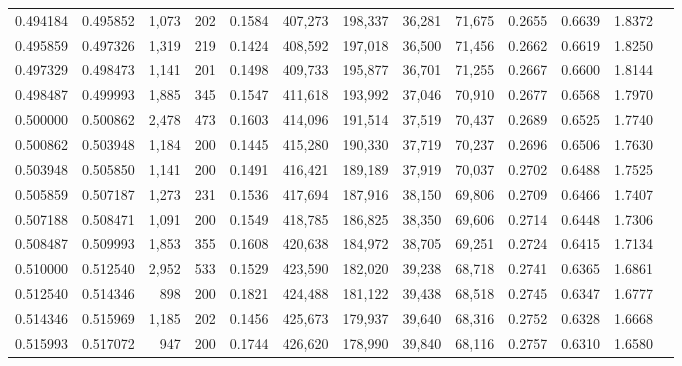 \begin{tabular}{rrrrrrrrrrrrr}
0.494184 & 0.495852 & 1,073 & 202 &                                     0.1584 & 407,273 & 198,337 &  36,281 &  71,675 & 0.2655 & 0.6639 & 1.8372 \\
0.495859 & 0.497326 & 1,319 & 219 &                                     0.1424 & 408,592 & 197,018 &  36,500 &  71,456 & 0.2662 & 0.6619 & 1.8250 \\
0.497329 & 0.498473 & 1,141 & 201 &                                     0.1498 & 409,733 & 195,877 &  36,701 &  71,255 & 0.2667 & 0.6600 & 1.8144 \\
0.498487 & 0.499993 & 1,885 & 345 &                                     0.1547 & 411,618 & 193,992 &  37,046 &  70,910 & 0.2677 & 0.6568 & 1.7970 \\
0.500000 & 0.500862 & 2,478 & 473 &                                     0.1603 & 414,096 & 191,514 &  37,519 &  70,437 & 0.2689 & 0.6525 & 1.7740 \\
0.500862 & 0.503948 & 1,184 & 200 &                                     0.1445 & 415,280 & 190,330 &  37,719 &  70,237 & 0.2696 & 0.6506 & 1.7630 \\
0.503948 & 0.505850 & 1,141 & 200 &                                     0.1491 & 416,421 & 189,189 &  37,919 &  70,037 & 0.2702 & 0.6488 & 1.7525 \\
0.505859 & 0.507187 & 1,273 & 231 &                                     0.1536 & 417,694 & 187,916 &  38,150 &  69,806 & 0.2709 & 0.6466 & 1.7407 \\
0.507188 & 0.508471 & 1,091 & 200 &                                     0.1549 & 418,785 & 186,825 &  38,350 &  69,606 & 0.2714 & 0.6448 & 1.7306 \\
0.508487 & 0.509993 & 1,853 & 355 &                                     0.1608 & 420,638 & 184,972 &  38,705 &  69,251 & 0.2724 & 0.6415 & 1.7134 \\
0.510000 & 0.512540 & 2,952 & 533 &                                     0.1529 & 423,590 & 182,020 &  39,238 &  68,718 & 0.2741 & 0.6365 & 1.6861 \\
0.512540 & 0.514346 &   898 & 200 &                                     0.1821 & 424,488 & 181,122 &  39,438 &  68,518 & 0.2745 & 0.6347 & 1.6777 \\
0.514346 & 0.515969 & 1,185 & 202 &                                     0.1456 & 425,673 & 179,937 &  39,640 &  68,316 & 0.2752 & 0.6328 & 1.6668 \\
0.515993 & 0.517072 &   947 & 200 &                                     0.1744 & 426,620 & 178,990 &  39,840 &  68,116 & 0.2757 & 0.6310 & 1.6580 \\

\end{tabular}
